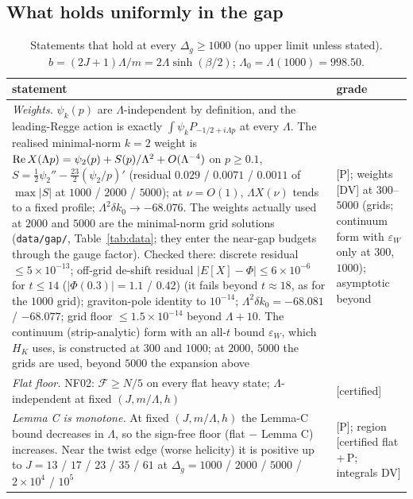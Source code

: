 \documentclass[aps,prl,onecolumn,superscriptaddress,nofootinbib]{revtex4-2}
\begin{document}
\subsection{What holds uniformly in the gap}
\begin{table}[!htbp]
\caption{\label{tab:allgapU}Statements that hold at every $\Delta_g\ge1000$ (no upper limit unless stated). $b=(2J+1)\Lambda/m
=2\Lambda\sinh(\beta/2)$; $\Lambda_0=\Lambda(1000)=998.50$.}
\footnotesize
\begin{ruledtabular}
\begin{tabular}{L{11.6cm}L{4.6cm}}
statement & grade\\\hline
\emph{Weights.} $\psi_k(p)$ are $\Lambda$-independent by definition, and the leading-Regge action is exactly $\int\psi_kP_{-1/2+i\Lambda p}$
at every $\Lambda$. The realised minimal-norm $k=2$ weight is ${\rm Re}\,X(\Lambda p)=\psi_2(p)+S(p)/\Lambda^2+O(\Lambda^{-4})$ on $p\ge0.1$,
$S=\tfrac12\psi_2''-\tfrac{23}2(\psi_2/p)'$ (residual $0.029$ / $0.0071$ / $0.0011$ of $\max|S|$ at $1000$ / $2000$ / $5000$); at
$\nu=O(1)$, $\Lambda X(\nu)$ tends to a fixed profile; $\Lambda^2\delta k_0\to-68.076$. The weights actually used at $2000$ and $5000$
are the minimal-norm grid solutions (\texttt{data/gap/}, Table~\ref{tab:data}; they enter the near-gap budgets through the gauge
factor). Checked there: discrete residual $\le5\times10^{-13}$; off-grid de-shift residual $|E[X]-\Phi|\le6\times10^{-6}$ for $t\le14$
($|\Phi(0.3)|=1.1$ / $0.42$) (it fails beyond $t\approx18$, as for the $1000$ grid); graviton-pole identity to
$10^{-14}$; $\Lambda^2\delta k_0=-68.081$ / $-68.077$; grid floor $\le1.5\times10^{-14}$ beyond $\Lambda+10$. The continuum (strip-analytic) form with an all-$t$ bound $\varepsilon_W$, which $H_K$ uses, is constructed at $300$ and $1000$; at $2000$, $5000$ the grids are used, beyond $5000$ the expansion above & [P]; weights [DV] at $300$--$5000$ (grids; continuum form with $\varepsilon_W$ only at $300$, $1000$);
asymptotic beyond\\
\emph{Flat floor.} NF02: $\mathcal F\ge N/5$ on every flat heavy state; $\Lambda$-independent at fixed $(J,m/\Lambda,h)$ & [certified]\\
\emph{Lemma C is monotone.} At fixed $(J,m/\Lambda,h)$ the Lemma-C bound decreases in $\Lambda$, so the sign-free floor (flat $-$ Lemma C)
increases. Near the twist edge (worse helicity) it is positive up to $J=13$ / $17$ / $23$ / $35$ / $61$ at $\Delta_g=1000$ / $2000$ /
$5000$ / $2\times10^4$ / $10^5$ & [P]; region [certified flat\,+\,P; integrals DV]\\

\end{tabular}
\end{ruledtabular}
\end{table}
\end{document}
